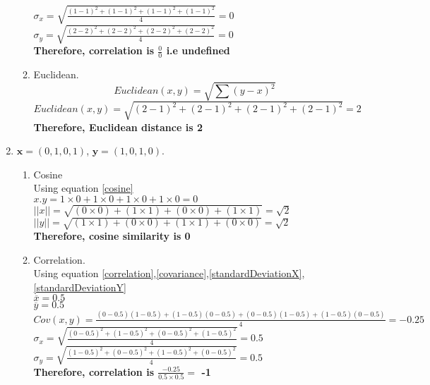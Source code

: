 \documentclass{article}
\begin{document}
\begin{enumerate}
\begin{enumerate}
        $\sigma_x = \sqrt{\frac{(1-1)^2+(1-1)^2+(1-1)^2+(1-1)^2}{4}} = 0$\\
        $\sigma_y = \sqrt{\frac{(2-2)^2+(2-2)^2+(2-2)^2+(2-2)^2}{4}} = 0$\\
        \textbf{Therefore, correlation is $\frac{0}{0}$ i.e undefined}\\
        \item Euclidean.\\
        \begin{equation} \label{euclidean}
            Euclidean(x,y) = \sqrt{\sum (y-x)^2}
        \end{equation}
        $Euclidean(x,y) = \sqrt{(2-1)^2+(2-1)^2+(2-1)^2+(2-1)^2} = 2$\\
        \textbf{Therefore, Euclidean distance is 2}\\
    \end{enumerate}
    \item $\textbf{x} = (0,1,0,1)$, $\textbf{y} = (1,0,1,0)$.\\  
        \begin{enumerate}
        \item Cosine\\
        Using equation \ref{cosine}\\
        $x.y = 1\times0 + 1\times0 + 1\times0 +  1\times0 = 0$\\
        $||x|| = \sqrt{(0\times0)+(1\times1)+(0\times0)+(1\times1)} = \sqrt{2}$\\
        $||y|| = \sqrt{(1\times1)+(0\times0)+(1\times1)+(0\times0)} = \sqrt{2}$\\
        \textbf{Therefore, cosine similarity is 0}
        \item Correlation.\\
        Using equation \ref{correlation},\ref{covariance},\ref{standardDeviationX},\ref{standardDeviationY}\\
        $\overline{x} = 0.5$ \\
        $\overline{y} = 0.5$\\
        $Cov(x,y) = \frac{(0-0.5)(1-0.5)+(1-0.5)(0-0.5)+(0-0.5)(1-0.5)+(1-0.5)(0-0.5)}{4} = -0.25$\\
        $\sigma_x = \sqrt{\frac{(0-0.5)^2+(1-0.5)^2+(0-0.5)^2+(1-0.5)^2}{4}} = 0.5$\\
        $\sigma_y = \sqrt{\frac{(1-0.5)^2+(0-0.5)^2+(1-0.5)^2+(0-0.5)^2}{4}} = 0.5$\\
        \textbf{Therefore, correlation is $\frac{-0.25}{0.5\times0.5} = $  -1}\\

\end{enumerate}
\end{enumerate}
\end{document}
